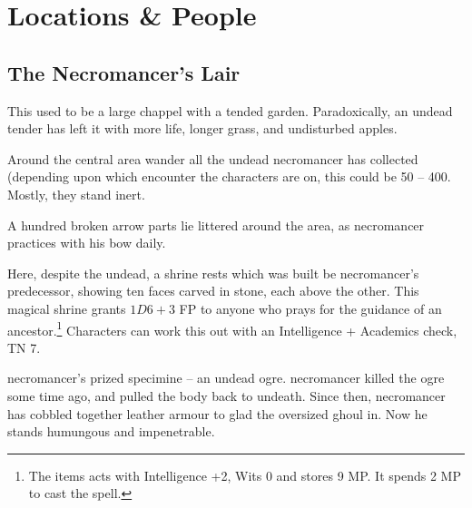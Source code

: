 \section{Locations \& People}

\begin{multicols}{2}

\setcounter{list}{0}

\subsection{The Necromancer's Lair}\label{necromancers_lair}
This used to be a large chappel with a tended garden.  Paradoxically, an undead tender has left it with more life, longer grass, and undisturbed apples.




Around the central area wander all the undead \gls{necromancer} has collected (depending upon which encounter the characters are on, this could be 50 -- 400.  Mostly, they stand inert.

A hundred broken arrow parts lie littered around the area, as \gls{necromancer} practices with his bow daily.


\ghoul


Here, despite the undead, a shrine rests which was built be \gls{necromancer}'s predecessor, showing ten faces carved in stone, each above the other.  This magical shrine grants $1D6 + 3$ FP to anyone who prays for the guidance of an ancestor.\footnote{The items acts with Intelligence +2, Wits 0 and stores 9 MP. It spends 2 MP to cast the spell.}  Characters can work this out with an Intelligence + Academics check, TN 7.


\Gls{necromancer}'s prized specimine -- an undead ogre.
\Gls{necromancer} killed the ogre some time ago, and pulled the body back to undeath.
Since then, \gls{necromancer} has cobbled together leather armour to glad the oversized ghoul in.
Now he stands humungous and impenetrable.


\end{multicols}
